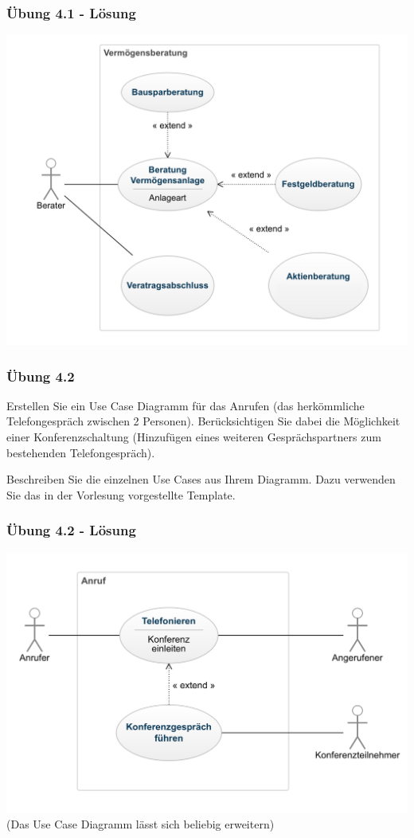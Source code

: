 \ifloesung
\begin{frame}
\frametitle{Übung 4.1 - Lösung}
	\includegraphics[width=1\textwidth,
	keepaspectratio=true]{bilder/use_case_aufg1_lsg.png}
\end{frame}
\fi

\begin{frame}
\frametitle{Übung 4.2}
	Erstellen Sie ein Use Case Diagramm für das Anrufen (das herkömmliche Telefongespräch zwischen 2 Personen).
	Berücksichtigen Sie dabei die Möglichkeit einer Konferenzschaltung (Hinzufügen eines weiteren Gesprächspartners
	zum bestehenden Telefongespräch).

	Beschreiben Sie die einzelnen Use Cases aus Ihrem Diagramm. Dazu verwenden Sie das in der Vorlesung vorgestellte
	Template.
\end{frame}

\ifloesung
\begin{frame}
\frametitle{Übung 4.2 - Lösung}
	\includegraphics[width=1\textwidth,
	keepaspectratio=true]{bilder/use_case_aufg2_lsg.png}
	(Das Use Case Diagramm lässt sich beliebig erweitern)
\end{frame}
\fi


